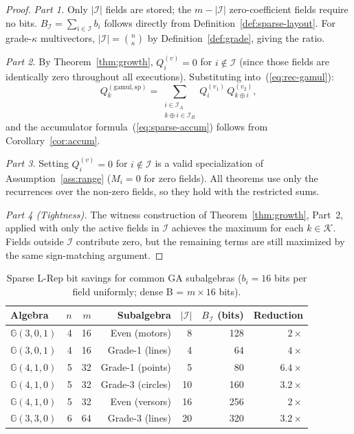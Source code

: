 \documentclass[11pt,a4paper]{article}
\theoremstyle{definition}
\theoremstyle{plain}
\theoremstyle{remark}
\newcommand{\GA}{\mathbb{G}}
\begin{document}
\begin{proof}
\textit{Part 1.}
Only $|\mathcal{I}|$ fields are stored; the $m - |\mathcal{I}|$
zero-coefficient fields require no bits.
$B_{\mathcal{I}} = \sum_{i \in \mathcal{I}} b_i$ follows directly
from Definition~\ref{def:sparse-layout}.
For grade-$\kappa$ multivectors, $|\mathcal{I}| = \binom{n}{\kappa}$
by Definition~\ref{def:grade}, giving the ratio.

\textit{Part 2.}
By Theorem~\ref{thm:growth}, $Q_i^{(v)} = 0$ for $i \notin \mathcal{I}$
(since those fields are identically zero throughout all executions).
Substituting into~(\ref{eq:rec-gamul}):
\[
  Q_k^{(\mathrm{gamul,sp})}
  = \sum_{\substack{i \in \mathcal{I}_A \\ k\oplus i \in \mathcal{I}_B}}
    Q_i^{(v_1)}\,Q_{k\oplus i}^{(v_2)},
\]
and the accumulator formula~(\ref{eq:sparse-accum}) follows from
Corollary~\ref{cor:accum}.

\textit{Part 3.}
Setting $Q_i^{(v)} = 0$ for $i \notin \mathcal{I}$ is a valid
specialization of Assumption~\ref{ass:range} ($M_i = 0$ for zero fields).
All theorems use only the recurrences over the non-zero fields, so they
hold with the restricted sums.

\textit{Part 4 (Tightness).}
The witness construction of Theorem~\ref{thm:growth}, Part~2, applied
with only the active fields in $\mathcal{I}$ achieves the maximum
for each $k \in \mathcal{K}$.
Fields outside $\mathcal{I}$ contribute zero, but the remaining terms
are still maximized by the same sign-matching argument.
\end{proof}

\begin{table}[h]
\centering
\caption{Sparse L-Rep bit savings for common GA subalgebras
($b_i = 16$ bits per field uniformly; dense B = $m \times 16$ bits).}
\label{tab:sparse}
\begin{tabular}{lrrrrrr}
\toprule
Algebra & $n$ & $m$ & Subalgebra & $|\mathcal{I}|$ & $B_{\mathcal{I}}$ (bits) & Reduction \\
\midrule
$\GA(3,0,1)$ & 4 & 16 & Even (motors) & 8 & 128 & $2\times$ \\
$\GA(3,0,1)$ & 4 & 16 & Grade-1 (lines) & 4 & 64 & $4\times$ \\
$\GA(4,1,0)$ & 5 & 32 & Grade-1 (points) & 5 & 80 & $6.4\times$ \\
$\GA(4,1,0)$ & 5 & 32 & Grade-3 (circles) & 10 & 160 & $3.2\times$ \\
$\GA(4,1,0)$ & 5 & 32 & Even (versors) & 16 & 256 & $2\times$ \\
$\GA(3,3,0)$ & 6 & 64 & Grade-3 (lines) & 20 & 320 & $3.2\times$ \\
\bottomrule
\end{tabular}
\end{table}
\end{document}
